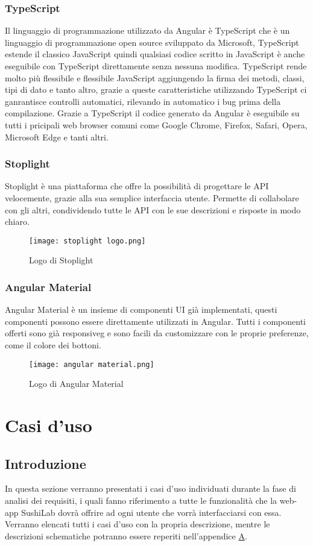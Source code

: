 \subsubsection{TypeScript}
Il linguaggio di programmazione utilizzato da Angular è TypeScript che è un linguaggio di programmazione open source sviluppato da Microsoft, TypeScript estende il classico JavaScript quindi qualsiasi codice scritto in JavaScript è anche eseguibile con TypeScript direttamente senza nessuna modifica. TypeScript rende molto più flessibile e flessibile JavaScript aggiungendo la firma dei metodi, classi, tipi di dato e tanto altro, grazie a queste caratteristiche utilizzando TypeScript ci ganrantisce controlli automatici, rilevando in automatico i bug prima della compilazione. Grazie a TypeScript il codice generato da Angular è eseguibile su tutti i pricipali web browser comuni come Google Chrome, Firefox, Safari, Opera, Microsoft Edge e tanti altri.
\subsubsection{Stoplight}
Stoplight è una piattaforma che offre la possibilità di progettare le API velocemente, grazie alla sua semplice interfaccia utente. Permette di collabolare con gli altri, condividendo tutte le API con le sue descrizioni e risposte in modo chiaro.
\begin{figure}[H]
    \centering
    \texttt{[image: stoplight logo.png]}
    \caption{Logo di Stoplight}
\end{figure}
\subsubsection{Angular Material}
Angular Material è un insieme di componenti UI già implementati, questi componenti possono essere direttamente utilizzati in Angular. Tutti i componenti offerti sono già \gls{responsiveg} e sono facili da customizzare con le proprie preferenze, come il colore dei bottoni.
\begin{figure}[H]
    \centering
    \texttt{[image: angular material.png]}
    \caption{Logo di Angular Material}
\end{figure}
\section{Casi d'uso}
\subsection{Introduzione}
In questa sezione verranno presentati i casi d'uso individuati durante la fase di analisi dei requisiti, i quali fanno riferimento a tutte le funzionalità che la web-app SushiLab dovrà offrire ad ogni utente che vorrà interfacciarsi con essa. Verranno elencati tutti i casi d'uso con la propria descrizione, mentre le descrizioni schematiche potranno essere reperiti nell'appendice {\hyperref[cap:appendice a]{A}}.
